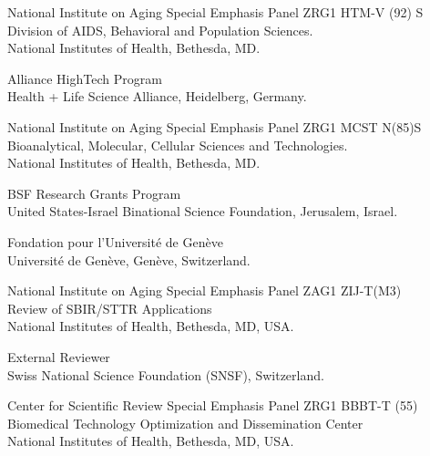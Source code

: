 \begin{description}[
  style=unboxed,
  leftmargin=!,
  labelwidth=3.2em,   %
  labelsep=0.8em,     %
  font=\normalfont,   %
  itemsep=0.35\baselineskip,
]

\item[2026] National Institute on Aging Special Emphasis Panel ZRG1 HTM-V (92) S\\
    Division of AIDS, Behavioral and Population Sciences. \\
    National Institutes of Health, Bethesda, MD.

\item[2026] Alliance HighTech Program\\
    Health + Life Science Alliance, Heidelberg, Germany.
    
\item[2026] National Institute on Aging Special Emphasis Panel ZRG1 MCST N(85)S\\
    Bioanalytical, Molecular, Cellular Sciences and Technologies. \\
    National Institutes of Health, Bethesda, MD.
    
 \item[2026] BSF Research Grants Program\\
    United States-Israel Binational Science Foundation, Jerusalem, Israel.
    
 \item[2026] Fondation pour l'Universit\'{e} de Gen\`{e}ve\\
    Universit\'{e} de Gen\`{e}ve, Gen\`{e}ve, Switzerland.

\item[2025] National Institute on Aging Special Emphasis Panel ZAG1 ZIJ-T(M3)\\
    Review of SBIR/STTR Applications\\
    National Institutes of Health, Bethesda, MD, USA.

\item[2025] External Reviewer\\
    Swiss National Science Foundation (SNSF), Switzerland.

\item[2024] Center for Scientific Review Special Emphasis Panel ZRG1 BBBT-T (55)\\
    Biomedical Technology Optimization and Dissemination Center\\
    National Institutes of Health, Bethesda, MD, USA. \\
    

\end{description}
